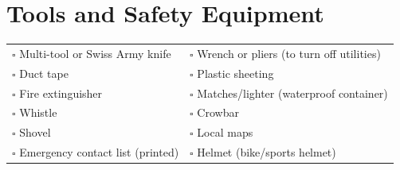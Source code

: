 
\section{Tools and Safety Equipment}
\label{sec:safety}

\begin{tabular}{p{9cm} p{9cm}}
$\square$ Multi-tool or Swiss Army knife & $\square$ Wrench or pliers (to turn off utilities) \\ 
$\square$ Duct tape & $\square$ Plastic sheeting \\ 
$\square$ Fire extinguisher & $\square$ Matches/lighter (waterproof container) \\ 
$\square$ Whistle & $\square$ Crowbar \\ 
$\square$ Shovel & $\square$ Local maps \\ 
$\square$ Emergency contact list (printed) & $\square$ Helmet (bike/sports helmet) \\ 
\end{tabular}

